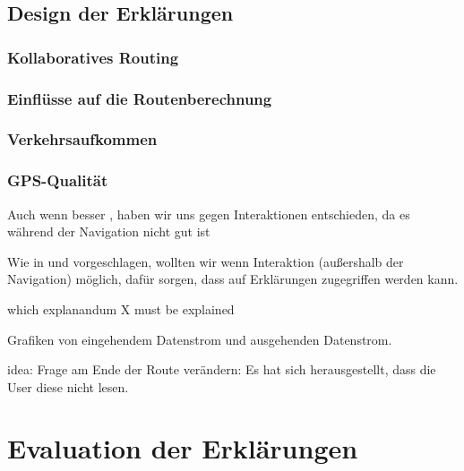 \subsection{Design der Erklärungen}

\subsubsection{Kollaboratives Routing}
\label{sec:06_model_evaluation_user_count_definition}

\subsubsection{Einflüsse auf die Routenberechnung}
\label{sec:06_model_evaluation_rotue_explanation_definition}

\subsubsection{Verkehrsaufkommen}
\label{06_model_evaluation:traffic_volume_definition}

\subsubsection{GPS-Qualität}
\label{06_model_evaluation:gps_accuracy_definition}

Auch wenn besser \cite{riveiro_thats_2021}, haben wir uns gegen Interaktionen entschieden, da es während der Navigation nicht gut ist

Wie in \cite{chazette_end-users_nodate} und \cite{wang_integration_2020} vorgeschlagen, wollten wir wenn Interaktion (außershalb der Navigation) möglich, dafür sorgen, dass auf Erklärungen zugegriffen werden kann.

which explanandum X must be explained \cite{kohl_explainability_2019}

Grafiken von eingehendem Datenstrom und ausgehenden Datenstrom.

idea: Frage am Ende der Route verändern: Es hat sich herausgestellt, dass die User diese nicht lesen.

\section{Evaluation der Erklärungen}





